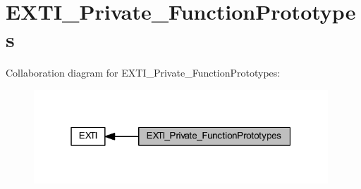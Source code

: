 \hypertarget{group___e_x_t_i___private___function_prototypes}{}\section{E\+X\+T\+I\+\_\+\+Private\+\_\+\+Function\+Prototypes}
\label{group___e_x_t_i___private___function_prototypes}
Collaboration diagram for E\+X\+T\+I\+\_\+\+Private\+\_\+\+Function\+Prototypes\+:
\nopagebreak
\begin{figure}[H]
\begin{center}
\leavevmode
\includegraphics[width=313pt]{group___e_x_t_i___private___function_prototypes}
\end{center}
\end{figure}
